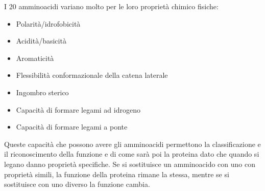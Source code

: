 I 20 amminoacidi variano molto per le loro proprietà chimico fisiche:

\begin{itemize}
\item
Polarità/idrofobicità
\item
Acidità/basicità
\item
Aromaticità
\item
Flessibilità conformazionale della catena laterale
\item
Ingombro sterico
\item
Capacità di formare legami ad idrogeno
\item
Capacità di formare legami a ponte
\end{itemize}

Queste capacità che possono avere gli amminoacidi permettono la
classificazione e il riconoscimento della funzione e di come sarà poi la
proteina dato che quando si legano danno proprietà specifiche. Se si sostituisce un amminoacido con uno con proprietà simili, la
funzione della proteina rimane la stessa, mentre se si sostituisce con
uno diverso la funzione cambia.

